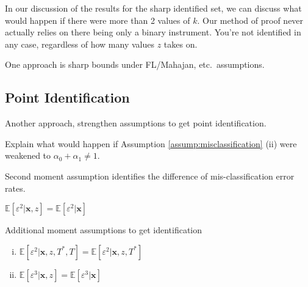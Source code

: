 In our discussion of the results for the sharp identified set, we can discuss what would happen if there were more than 2 values of $k$.
Our method of proof never actually relies on there being only a binary instrument. 
You're not identified in any case, regardless of how many values $z$ takes on.





One approach is sharp bounds under FL/Mahajan, etc.\ assumptions.

\subsection{Point Identification}
Another approach, strengthen assumptions to get point identification.

Explain what would happen if Assumption \ref{assump:misclassification} (ii) were weakened to $\alpha_0 + \alpha_1 \neq 1$.

\noindent Second moment assumption identifies the difference of mis-classification error rates.
\begin{assump} \mbox{}
  \label{assump:2ndMoment}
    $\mathbb{E}[\varepsilon^2|\mathbf{x},z] = \mathbb{E}[\varepsilon^2|\mathbf{x}]$ 
\end{assump}

\noindent Additional moment assumptions to get identification
\begin{assump} \mbox{}
  \label{assump:3rdMoment}
  \begin{enumerate}[(i)] 
    \item $\mathbb{E}[\varepsilon^2|\mathbf{x},z,T^*,T] = \mathbb{E}[\varepsilon^2|\mathbf{x},z, T^*]$
    \item $\mathbb{E}[\varepsilon^3|\mathbf{x},z] = \mathbb{E}[\varepsilon^3|\mathbf{x}]$
  \end{enumerate}
\end{assump}



